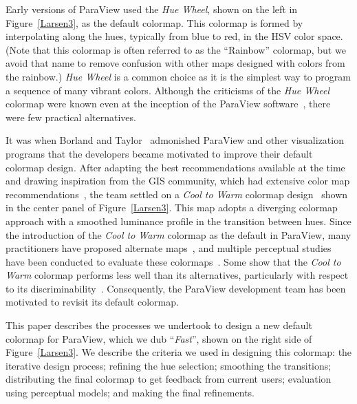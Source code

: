 \documentclass{IEEEcsmag}
\newcommand*{\colormap}[1]{\textsl{#1}\xspace}
\newcommand*{\huewheel}{\colormap{Hue Wheel}}
\newcommand*{\coolwarm}{\colormap{Cool to Warm}}
\newcommand*{\fast}{\colormap{Fast}}
\begin{document}
Early versions of ParaView used the \huewheel, shown on the left in Figure~\ref{Larsen3}, as the default colormap.
This colormap is formed by interpolating along the hues, typically from blue to red, in the HSV color space.
(Note that this colormap is often referred to as the ``Rainbow'' colormap, but we avoid that name to remove confusion with other maps designed with colors from the rainbow.)
\huewheel is a common choice as it is the simplest way to program a sequence of many vibrant colors.
Although the criticisms of the \huewheel colormap were known even at the inception of the ParaView software~\cite{Rogowitz1998}, there were few practical alternatives.

It was when Borland and Taylor~\cite{Borland2007} admonished ParaView and other visualization programs that the developers became motivated to improve their default colormap design.
After adapting the best recommendations available at the time and drawing inspiration from the GIS community, which had extensive color map recommendations~\cite{Brewer2003}, the team settled on a \coolwarm colormap design~\cite{Moreland2009} shown in the center panel of Figure~\ref{Larsen3}.
This map adopts a diverging colormap approach with a smoothed luminance profile in the transition between hues.
Since the introduction of the \coolwarm colormap as the default in ParaView, many practitioners have proposed alternate maps~\cite{Samsel2015}, and multiple perceptual studies have been conducted to evaluate these colormaps~\cite{Ware2017}.
Some show that the \coolwarm colormap performs less well than its alternatives, particularly with respect to its discriminability~\cite{Ware2017,Ware2019}.
Consequently, the ParaView development team has been motivated to revisit its default colormap.

This paper describes the processes we undertook to design a new default colormap for ParaView, which we dub ``\fast'', shown on the right side of Figure~\ref{Larsen3}.
We describe the criteria we used in designing this colormap: the iterative design process; refining the hue selection; smoothing the transitions; distributing the final colormap to get feedback from current users; evaluation using perceptual models; and making the final refinements.
\end{document}
